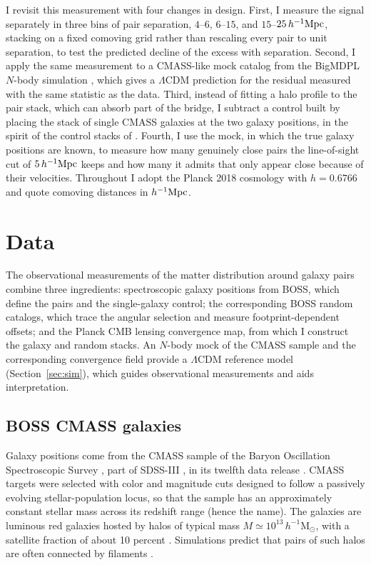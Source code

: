\documentclass[11pt,letterpaper]{article}
\newcommand{\hinvMpc}{h^{-1}{\rm Mpc}}
\begin{document}
I revisit this measurement with four changes in design. First, I measure
the signal separately in three bins of pair separation, $4$--$6$, $6$--$15$,
and $15$--$25\,\hinvMpc$, stacking on a fixed comoving grid rather than
rescaling every pair to unit separation, to test the predicted decline of
the excess with separation. Second, I apply the same measurement to a
CMASS-like mock catalog from the BigMDPL $N$-body simulation
\citep{Klypin2016}, which gives a $\Lambda$CDM prediction for the residual
measured with the same statistic as the data. Third, instead of fitting a
halo profile to the pair stack, which can absorb part of the bridge, I
subtract a control built by placing the stack of single CMASS galaxies at
the two galaxy positions, in the spirit of the control stacks of
\citet{EppsHudson2017}. Fourth, I use the mock, in which the true galaxy
positions are known, to measure how many genuinely close pairs the
line-of-sight cut of $5\,\hinvMpc$ keeps and how many it admits that only
appear close because of their velocities. Throughout I adopt the Planck
2018 cosmology with $h=0.6766$ and quote comoving distances in $\hinvMpc$.

\section{Data}
\label{sec:data}

The observational measurements of the matter distribution around galaxy pairs combine three ingredients: spectroscopic galaxy positions
from BOSS, which define the pairs and the single-galaxy control; the
corresponding BOSS random catalogs, which trace the angular selection and
measure footprint-dependent offsets; and the Planck CMB lensing convergence
map, from which I construct the galaxy and random stacks. An $N$-body mock
of the CMASS sample and the corresponding convergence field provide a $\Lambda$CDM
reference model
(Section~\ref{sec:sim}), which guides observational measurements and aids interpretation.

\subsection{BOSS CMASS galaxies}
\label{sec:data_cmass}

Galaxy positions come from the CMASS sample of the Baryon Oscillation
Spectroscopic Survey \citep[BOSS;][]{Dawson2013}, part of SDSS-III
\citep{Eisenstein2011}, in its twelfth data release
\citep{Alam2015, Reid2016}. CMASS targets were selected with color and
magnitude cuts designed to follow a passively evolving stellar-population
locus, so that the sample has an approximately constant stellar mass across
its redshift range (hence the name). The galaxies are luminous red galaxies
hosted by halos of typical mass $M\simeq10^{13}\,h^{-1}\mathrm{M}_{\odot}$,
with a satellite fraction of about 10 percent \citep{White2011}. 
Simulations predict that pairs of such halos are often connected by filaments \citep{Colberg2005}.
\end{document}
